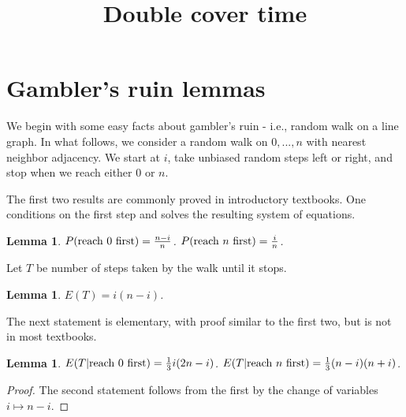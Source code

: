 \documentclass[12pt]{amsart}
\title{Double cover time}
\theoremstyle{plain}
\newtheorem{lemma}[theorem]{Lemma}
\theoremstyle{definition}
\theoremstyle{remark}
\begin{document}
\maketitle
\section{Gambler's ruin lemmas}
We begin with some easy facts about gambler's ruin - i.e., random walk on a line graph.
In what follows, we consider a random walk on ${0, ..., n}$ with nearest neighbor adjacency.
We start at $i$, take unbiased random steps left or right, and stop when we reach either $0$ or $n$.

The first two results are commonly proved in introductory textbooks.
One conditions on the first step and solves the resulting system of equations.

\begin{lemma}
$P(\textup{reach 0 first}) = \frac{n-i}{n}$.
$P(\textup{reach $n$ first}) = \frac{i}{n}$.
\end{lemma}

Let $T$ be number of steps taken by the walk until it stops.

\begin{lemma}
$E(T) = i(n-i)$.
\end{lemma}

The next statement is elementary, with proof similar to the first two, but is not in most textbooks. 

\begin{lemma}
$E(T|\textup{reach 0 first}) = \frac{1}{3}i(2n-i)$.
$E(T|\textup{reach $n$ first}) = \frac{1}{3}(n-i)(n+i)$.
\end{lemma}
\begin{proof}
The second statement follows from the first by the change of variables $i \mapsto n-i$.

\end{proof}
\end{document}
